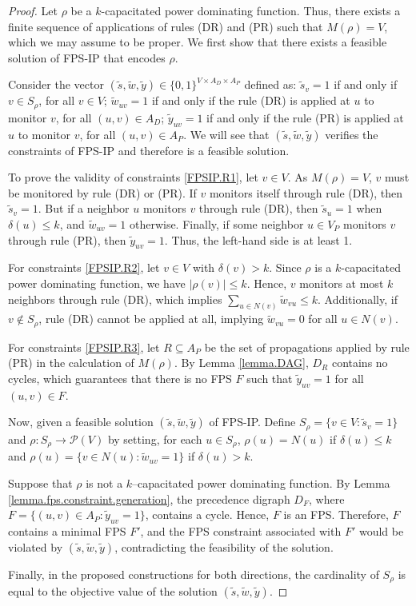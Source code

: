 \documentclass[10pt,a4paper]{amsart}
\newcommand{\FPSIP}{FPS-IP\xspace}
\newcommand{\PP}{{\mathcal P}}
\begin{document}
\begin{proof}
Let $\rho$ be a $k$-capacitated power dominating function. 
Thus, there exists a finite sequence of applications of rules (DR) and (PR) such that $M(\rho) = V$, which we may assume to be proper.
We first show that there exists a feasible solution of \FPSIP that encodes $\rho$.

Consider the vector $(\tilde s, \tilde w, \tilde y) \in \{0,1\}^{V \times A_D \times A_P}$ defined as: $\tilde s_v = 1$ if and only if $v \in S_{\rho}$, for all $v \in V$; $\tilde w_{uv} = 1$ if and only if the rule (DR) is applied at $u$ to monitor $v$, for all $(u,v) \in A_D$; $\tilde y_{uv} = 1$ if and only if the rule (PR) is applied at $u$ to monitor $v$, for all $(u,v) \in A_P$.
We will see that $(\tilde s, \tilde w, \tilde y)$ verifies the constraints of \FPSIP and therefore is a feasible solution.

To prove the validity of constraints \eqref{FPSIP.R1}, let $v \in V$. 
As $M(\rho) = V$, $v$ must be monitored by rule (DR) or (PR).
If $v$ monitors itself through rule (DR), then $\tilde s_v = 1$.
But if a neighbor $u$ monitors $v$ through rule (DR), then $\tilde s_u = 1$ when $\delta(u) \leq k$, and $\tilde w_{uv} = 1$ otherwise.
Finally, if some neighbor $u \in V_P$ monitors $v$ through rule (PR), then $\tilde y_{uv} = 1$.
Thus, the left-hand side is at least 1.

For constraints \eqref{FPSIP.R2}, let $v \in V$ with $\delta(v) > k$. 
Since $\rho$ is a $k$-capacitated power dominating function, we have $|\rho(v)| \leq k$. Hence, $v$ monitors at most $k$ neighbors through rule (DR), which implies $\sum_{u \in N(v)} \tilde w_{vu} \leq k$. 
Additionally, if $v \notin S_{\rho}$, rule (DR) cannot be applied at all, implying $\tilde w_{vu} = 0$ for all $u \in N(v)$. 

For constraints \eqref{FPSIP.R3}, let $R \subseteq A_P$ be the set of propagations applied by rule (PR) in the calculation of $M(\rho)$. By Lemma \ref{lemma.DAG}, $D_R$ contains no  cycles, which guarantees that there is no FPS $F$ such that $\tilde y_{uv} = 1$ for all $(u,v) \in F$.

\medskip

Now, given a feasible solution $(\tilde s, \tilde w, \tilde y)$ of \FPSIP.
Define $S_{\rho} = \{v \in V: \tilde s_v = 1\}$ and $\rho: S_{\rho} \to \PP(V)$ by setting, for each $u \in S_{\rho}$, $\rho(u) = N(u)$ if $\delta(u) \leq k$ and $\rho(u) = \{v \in N(u): \tilde w_{uv} = 1\}$ if $\delta(u) > k$.

Suppose that $\rho$ is not a $k$--capacitated power dominating function.
By Lemma \ref{lemma.fps.constraint.generation}, the precedence digraph $D_F$, where $F = \{(u,v) \in A_P: \tilde y_{uv} = 1\}$, contains a  cycle.
Hence, $F$ is an FPS.
Therefore, $F$ contains a minimal FPS $F'$, and the FPS constraint associated with $F'$ would be violated by $(\tilde s, \tilde w, \tilde y)$, contradicting the feasibility of the solution.

\medskip

Finally, in the proposed constructions for both directions, the cardinality of $S_{\rho}$ is equal to the objective value of the solution $(\tilde s, \tilde w, \tilde y)$.
\end{proof}
\end{document}
